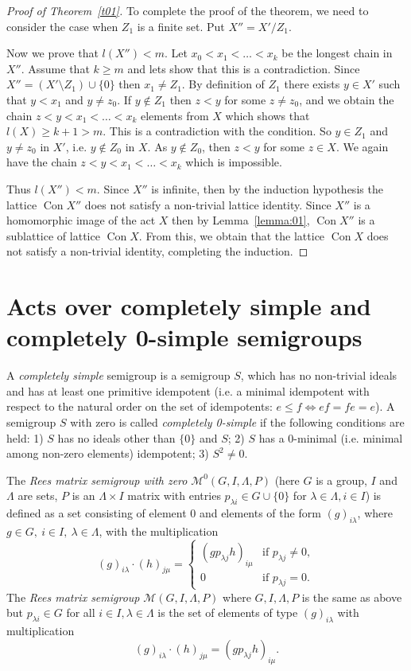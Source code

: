 \documentclass{birkau}
\numberwithin{equation}{section}
\theoremstyle{plain}
\theoremstyle{definition}
\DeclareMathOperator{\Con}{Con}
\begin{document}
\begin{proof}[Proof of Theorem~\ref{t01}]
		To complete the proof of the theorem, we need to consider the case when $Z_1$ is a finite set. Put $X'' = X'/{Z_1}$.
		
		Now we prove that $l(X'') < m$. Let $ x_0 < x_1 < \ldots < x_k $ be the longest chain in $X''$. Assume that $k \geqslant m$ and lets show that this is a contradiction. Since $X'' = (X' \setminus Z_1) \cup \{0\}$ then $ x_1 \neq Z_1$. By definition of $Z_1$ there exists $y \in X'$ such that $y < x_1$ and $y \neq z_0$. If $y \notin Z_1$ then $z < y$ for some $z \neq z_0$, and we obtain the chain $z < y < x_1 < \ldots < x_k $ elements from $X$ which shows that $l(X) \geqslant k+1 > m$. This is a contradiction with the condition. So $y \in Z_1$ and $y \neq z_0$ in $X'$, i.e. $y \not \in Z_0$ in $X$. As $y \notin Z_0$, then $ z < y$ for some $z \in X$. We again have the chain $ z < y < x_1 < \ldots < x_k $ which is impossible.
		
		Thus $ l(X'') < m$. Since $X''$ is infinite, then by the induction hypothesis the lattice $\Con X''$ does not satisfy a non-trivial lattice identity. Since $X''$ is a homomorphic image of the act $X$ then by Lemma~\ref{lemma:01}, $\Con X''$ is a sublattice of lattice $\Con X$. From this, we obtain that the lattice $\Con X$ does not satisfy a non-trivial identity, completing the induction.
	\end{proof}
	
	\section{Acts over completely simple and completely 0-simple semigroups}
	
    A \textit{completely simple} semigroup is a semigroup $S$, which has no non-trivial ideals and has at least one primitive idempotent (i.e. a minimal idempotent with respect to the natural order on the set of idempotents: $e \leqslant f \Leftrightarrow ef=fe=e$). A semigroup $S$ with zero is called \textit{completely 0-simple} if the following conditions are held: 1) $S$ has no ideals other than $\{0\}$ and $S$; 2) $S$ has a 0-minimal (i.e. minimal among non-zero elements) idempotent; 3) $S^2 \neq 0$.
	
	The \textit{Rees matrix semigroup with zero} $\mathcal{M}^0(G,I,\Lambda,P)$ (here $G$ is a group, $I$ and $\Lambda$ are sets, $P$ is an $\Lambda \times I$ matrix with entries $p_{\lambda i} \in G \cup \{ 0\}$ for $\lambda \in \Lambda, i \in I$) is defined as a set consisting of element 0 and elements of the form $(g)_{i\lambda}$, where $g \in G,\ i \in I,\ \lambda \in \Lambda$, with the multiplication
		$$ (g)_{i\lambda} \cdot (h)_{j\mu} =
			\begin{cases}
				(gp_{\lambda j}h)_{i\mu} & \text{if } p_{\lambda j} \neq 0,\\
				0 & \text{if } p_{\lambda j} = 0.
			\end{cases}
		$$
	The \textit{Rees matrix semigroup} $\mathcal{M}(G,I,\Lambda,P)$ where $G,I,\Lambda,P$ is the same as above but $p_{\lambda i} \in G$ for all $i \in I,\lambda \in \Lambda$ is the set of elements of type $(g)_{i\lambda}$ with multiplication $$ (g)_{i\lambda} \cdot (h)_{j\mu} = (gp_{\lambda j}h)_{i\mu}. $$
	
\end{document}
